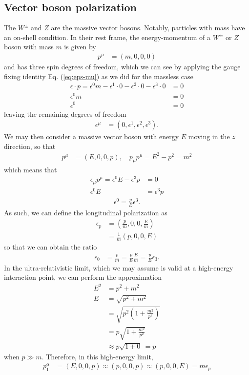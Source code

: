 \documentclass[12pt]{article}
\numberwithin{figure}{section}
\numberwithin{table}{section}
\newcommand{\p}[1]{\left(#1\right)}
\begin{document}
\subsection{Vector boson polarization}
The $W^\pm$ and $Z$ are the massive vector bosons. Notably, particles with mass have an on-shell condition. In their rest frame, the energy-momentum of a $W^\pm$ or $Z$ boson with mass $m$ is given by
\begin{align}
    p^\mu &= (m,0,0,0)
\end{align}
and has three spin degrees of freedom,
which we can see by applying the gauge fixing identity Eq. (\ref{eq:eps-mu}) as we did for the massless case
\begin{align*}
    \epsilon\cdot p = \epsilon^0m - \epsilon^1\cdot 0 - \epsilon^2\cdot 0-\epsilon^3\cdot 0 &= 0 \\
    \epsilon^0m &= 0\\
       \epsilon^0 &= 0
\end{align*}
leaving the remaining degrees of freedom
\begin{align*}
    \epsilon ^\mu&=(0,\epsilon^1,\epsilon^2,\epsilon^3).
\end{align*}
We may then consider a massive vector boson with energy $E$ moving in the $z$ direction, so that
\begin{align*}
    p^\mu &= (E, 0,0,p), \quad     p_\mu p^\mu = E^2-p^2 = m^2
\end{align*}
which means that
\begin{align*}
 \epsilon_\mu p^\mu = \epsilon^0E-\epsilon^3p&=0\\
 \epsilon^0E&=\epsilon^3p
 \end{align*}
 \begin{align*}
      \boxed{\epsilon^0=\frac{p}{E}\epsilon^3.}
 \end{align*}
As such, we can define the longitudinal polarization as
\begin{align*}
      \epsilon_p &= \p{\frac{p}{m}, 0 , 0, \frac{E}{m}}
      \\&= \frac{1}{m}\p{p,0,0,E}
\end{align*}
so that we can obtain the ratio
\begin{align*}
    \epsilon_0 &= \frac{p}{m} =\frac{p}{E} \frac{E}{m} = \frac{p}{E} \epsilon_3.
\end{align*}
In the ultra-relativistic limit, which we may assume is valid at a high-energy interaction point, we can perform the approximation
\begin{align*}
    E^2&= p^2+m^2 \\
   E &= \sqrt{p^2+m^2}\\
   &= \sqrt{p^2\p{1+\frac{m^2}{p^2}}}\\
   &= p\sqrt{1+\frac{m^2}{p^2}}\\
   &\approx p \sqrt{1+0}\ = p
\end{align*}
when $p\gg m$.
Therefore, in this high-energy limit,
\begin{align*}
 p_1^\alpha &= (E, 0,0,p) \approx (p,0,0,p)\approx (p,0,0,E) = m\epsilon_p
\end{align*}
\end{document}
